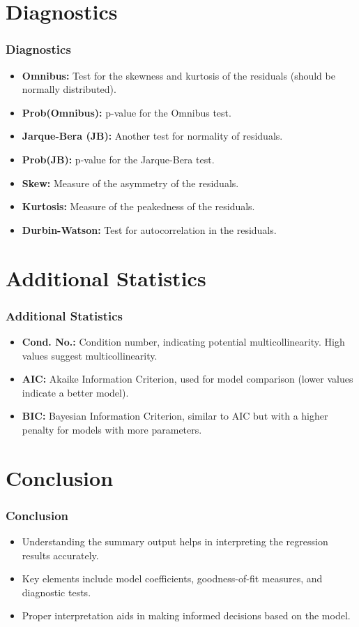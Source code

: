 \documentclass{beamer}
\begin{document}
\section{Diagnostics}
\begin{frame}
    \frametitle{Diagnostics}
    \begin{itemize}
        \item \textbf{Omnibus:} Test for the skewness and kurtosis of the residuals (should be normally distributed).
        \item \textbf{Prob(Omnibus):} p-value for the Omnibus test.
        \item \textbf{Jarque-Bera (JB):} Another test for normality of residuals.
        \item \textbf{Prob(JB):} p-value for the Jarque-Bera test.
        \item \textbf{Skew:} Measure of the asymmetry of the residuals.
        \item \textbf{Kurtosis:} Measure of the peakedness of the residuals.
        \item \textbf{Durbin-Watson:} Test for autocorrelation in the residuals.
    \end{itemize}
\end{frame}

\section{Additional Statistics}
\begin{frame}
    \frametitle{Additional Statistics}
    \begin{itemize}
        \item \textbf{Cond. No.:} Condition number, indicating potential multicollinearity. High values suggest multicollinearity.
        \item \textbf{AIC:} Akaike Information Criterion, used for model comparison (lower values indicate a better model).
        \item \textbf{BIC:} Bayesian Information Criterion, similar to AIC but with a higher penalty for models with more parameters.
    \end{itemize}
\end{frame}

\section{Conclusion}
\begin{frame}
    \frametitle{Conclusion}
    \begin{itemize}
        \item Understanding the summary output helps in interpreting the regression results accurately.
        \item Key elements include model coefficients, goodness-of-fit measures, and diagnostic tests.
        \item Proper interpretation aids in making informed decisions based on the model.
    \end{itemize}
\end{frame}
\end{document}
